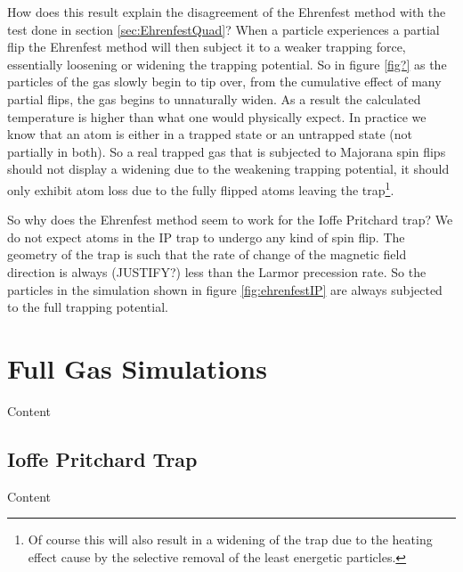 How does this result explain the disagreement of the Ehrenfest method with the test done in section \ref{sec:EhrenfestQuad}?
When a particle experiences a partial flip the Ehrenfest method will then subject it to a weaker trapping force, essentially loosening or widening the trapping potential.
So in figure \ref{fig?} as the particles of the gas slowly begin to tip over, from the cumulative effect of many partial flips, the gas begins to unnaturally widen.
As a result the calculated temperature is higher than what one would physically expect.
In practice we know that an atom is either in a trapped state or an untrapped state (not partially in both).
So a real trapped gas that is subjected to Majorana spin flips should not display a widening due to the weakening trapping potential, it should only exhibit atom loss due to the fully flipped atoms leaving the trap\footnote{Of course this will also result in a widening of the trap due to the heating effect cause by the selective removal of the least energetic particles.}.

So why does the Ehrenfest method seem to work for the Ioffe Pritchard trap?
We do not expect atoms in the IP trap to undergo any kind of spin flip.
The geometry of the trap is such that the rate of change of the magnetic field direction is always (JUSTIFY?) less than the Larmor precession rate.
So the particles in the simulation shown in figure \ref{fig:ehrenfestIP} are always subjected to the full trapping potential.


\section{Full Gas Simulations}

Content


\subsection{Ioffe Pritchard Trap}

Content

